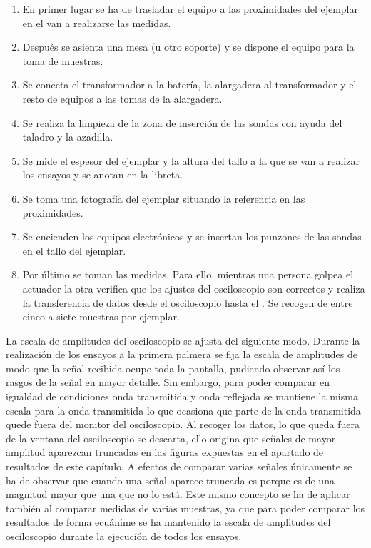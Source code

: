 \begin{enumerate}
    \item En primer lugar se ha de trasladar el equipo a las proximidades
	del ejemplar en el van a realizarse las medidas.
    \item Después se asienta una mesa (u otro soporte) y se dispone el
	equipo para la toma de muestras.
    \item Se conecta el transformador a la batería, la alargadera al
	transformador y el resto de equipos a las tomas de la alargadera.
    \item Se realiza la limpieza de la zona de inserción de las sondas con
	ayuda del taladro y la azadilla.
    \item Se mide el espesor del ejemplar y la altura del tallo a la que se
	van a realizar los ensayos y se anotan en la libreta.
    \item Se toma una fotografía del ejemplar situando la referencia en las
	proximidades.
    \item Se encienden los equipos electrónicos y se insertan los punzones
	de las sondas en el tallo del ejemplar.
    \item Por último se toman las medidas. Para ello, mientras una persona
	golpea el actuador la otra verifica que los ajustes del
	osciloscopio son correctos y realiza la transferencia de datos
	desde el osciloscopio hasta el . Se recogen de entre cinco
	a siete muestras por ejemplar.
\end{enumerate}

La escala de amplitudes del osciloscopio se ajusta del siguiente modo.
Durante la realización de los ensayos a la primera palmera se fija la
escala de amplitudes de modo que la señal recibida ocupe toda la pantalla,
pudiendo observar así los rasgos de la señal en mayor detalle. Sin embargo,
para poder comparar en igualdad de condiciones onda transmitida y onda
reflejada se mantiene la misma escala para la onda transmitida lo que
ocasiona que parte de la onda transmitida quede fuera del monitor del
osciloscopio. Al recoger los datos, lo que queda fuera de la ventana del
osciloscopio se descarta, ello origina que señales de mayor amplitud
aparezcan truncadas en las figuras expuestas en el apartado de resultados
de este capítulo. A efectos de comparar varias señales únicamente se ha de
observar que cuando una señal aparece truncada es porque es de una magnitud
mayor que una que no lo está. Este mismo concepto se ha de aplicar también
al comparar medidas de varias muestras, ya que para poder comparar los
resultados de forma ecuánime se ha mantenido la escala de amplitudes del
osciloscopio durante la ejecución de todos los ensayos.

